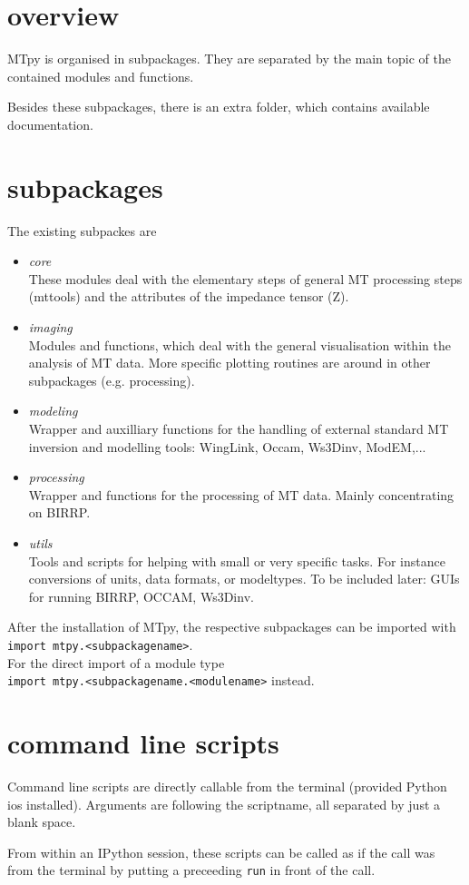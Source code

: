 \section{{overview} }
\label{sec:structure.overview}

MTpy is organised in subpackages. They are separated by the main topic of the contained modules and functions. 

Besides these subpackages, there is an extra folder, which contains available documentation.


\section{{subpackages} }
\label{sec:structure.subpackages}

The existing subpackes are 
\begin{itemize}
\item \textit{core}{~}\\
These modules deal with the elementary steps of general MT processing steps (mttools) and  the attributes of the impedance tensor (Z).
\item \textit{imaging}{~}\\
Modules and functions, which deal with the general visualisation within the analysis of MT data. More specific plotting routines are around in other subpackages (e.g. processing).  
\item \textit{modeling}{~}\\
Wrapper and auxilliary functions for the handling of external standard MT inversion and modelling tools: WingLink, Occam, Ws3Dinv, ModEM,...
\item \textit{processing}{~}\\
Wrapper and functions for the processing of MT data. Mainly concentrating on BIRRP.
\item \textit{utils}{~}\\
Tools and scripts for helping with small or very specific tasks. For instance conversions of units, data formats, or modeltypes. To be included later: GUIs for running BIRRP, OCCAM, Ws3Dinv.


\end{itemize} 
After the installation of MTpy, the respective subpackages can be imported with \\
\texttt{import mtpy.<subpackagename>}.\\ 
For the direct import of a module type\\ 
\texttt{import mtpy.<subpackagename.<modulename>} instead.

\section{{command line scripts} }
\label{sec:structure.commandline}

Command line scripts are directly callable from the terminal (provided Python ios installed). Arguments are following the scriptname, all separated by just a blank space.

From within an IPython session, these scripts can be called as if the call was from the terminal by putting a preceeding \texttt{run} in front of the call. 